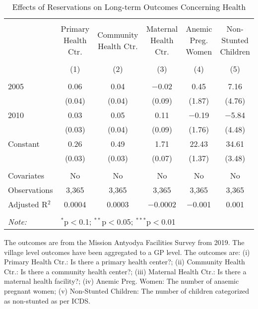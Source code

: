 \begin{sidewaystable}[!htbp]
\centering
\begin{threeparttable}

  \caption{Effects of Reservations on Long-term Outcomes Concerning Health} 
  \label{raj_shrug_health_05_10} 
\scriptsize 
\begin{tabular}{@{\extracolsep{0pt}}lccccc} 
\\[-1.8ex]\hline 
\hline \\[-1.8ex] 
 & Primary Health Ctr. & Community Health Ctr. & Maternal Health Ctr. & Anemic Preg. Women & Non-Stunted Children \\ 
\\[-1.8ex] & (1) & (2) & (3) & (4) & (5)\\ 
\hline \\[-1.8ex] 
 2005 & 0.06 & 0.04 & $-$0.02 & 0.45 & 7.16 \\ 
  & (0.04) & (0.04) & (0.09) & (1.87) & (4.76) \\ 
  2010 & 0.03 & 0.05 & 0.11 & $-$0.19 & $-$5.84 \\ 
  & (0.03) & (0.04) & (0.09) & (1.76) & (4.48) \\ 
  Constant & 0.26 & 0.49 & 1.71 & 22.43 & 34.61 \\ 
  & (0.03) & (0.03) & (0.07) & (1.37) & (3.48) \\ 
 \hline \\[-1.8ex] 
Covariates & No & No & No & No & No \\ 
Observations & 3,365 & 3,365 & 3,365 & 3,365 & 3,365 \\ 
Adjusted R$^{2}$ & 0.0004 & 0.0003 & $-$0.0002 & $-$0.001 & 0.001 \\ 
\hline 
\hline \\[-1.8ex] 
\textit{Note:}  & \multicolumn{5}{l}{$^{*}$p$<$0.1; $^{**}$p$<$0.05; $^{***}$p$<$0.01} \\ 
\end{tabular} 
\begin{tablenotes}[flushleft]
\setlength{\itemindent}{0em}
\scriptsize
\item The outcomes are from the Mission Antyodya Facilities Survey from 2019. The village level outcomes have been aggregated to a GP level. The outcomes are:
                    (i) Primary Health Ctr.: Is there a primary health center?;
                    (ii) Community Health Ctr.: Is there a community health center?;
                    (iii) Maternal Health Ctr.: Is there a maternal health facility?;
                    (iv) Anemic Preg. Women: The number of anaemic pregnant women;
                    (v) Non-Stunted Children: The number of children categorized as non-stunted as per ICDS.
\end{tablenotes}
\end{threeparttable}
\end{sidewaystable}
